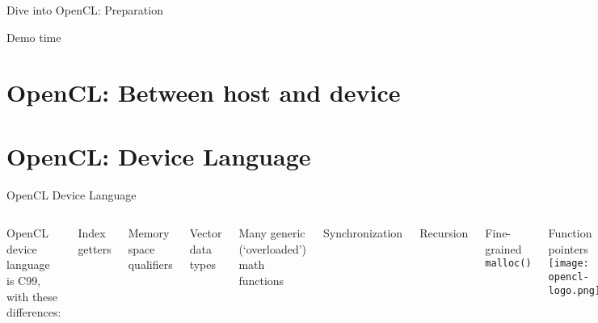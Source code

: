 \documentclass[english,compress]{beamer}
\begin{document}
{
\def\drawgroup#1{
  \foreach \i in {0,1,...,23}
    \foreach \j in {0,1,...,16}
    {
      \pgfmathtruncatemacro{\grp}{(\i+24*\j)/16}
      \ifthenelse{\equal{\grp}{#1}}
        {\def\grpcolor{gray!60}}
        {\def\grpcolor{gray!30}}
      \draw [line width=0.5pt,fill=\grpcolor] (\i,\j) rectangle +(1,1) ;
    }
}



\begin{frame}{Dive into OpenCL: Preparation}
  \begin{center}
  \Huge Demo time
  \end{center}
\end{frame}

\section{OpenCL: Between host and device}

\section{OpenCL: Device Language}
\begin{frame}{OpenCL Device Language}
  \begin{columns}
      OpenCL device language is C99, with these differences:

      \medskip
      \plusball Index getters

      \plusball Memory space qualifiers

      \plusball Vector data types 

      \plusball Many generic (`overloaded') math functions

      \plusball Synchronization

      \minusball Recursion

      \minusball Fine-grained \texttt{malloc()}

      \minusball Function pointers
      \texttt{[image: opencl-logo.png]}
  \end{columns}
\end{frame}

}
\end{document}
